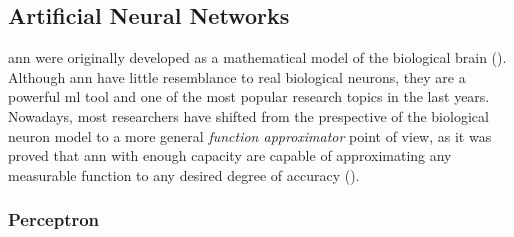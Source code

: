 \documentclass[../main.tex]{subfiles}
\begin{document}
\lipsum[1]

\subsection{Artificial Neural Networks}
\label{sec:artificial-neural-networks}

\gls{ann} were originally developed as a mathematical model of the biological brain
(\cite{McCulloch1943,Rosenblatt58theperceptron,Rumelhart1987}).
Although \gls{ann} have little resemblance to real biological neurons, they are
a powerful \gls{ml} tool and one of the most popular research topics in the last years.
Nowadays, most researchers have shifted from the prespective of the biological
neuron model to a more general \emph{function approximator} point of view, as it was
proved that \gls{ann} with enough capacity are capable of approximating any measurable
function to any desired degree of accuracy (\cite{Cybenko1989,Hornik1991251}).


\subsubsection{Perceptron}
\end{document}
